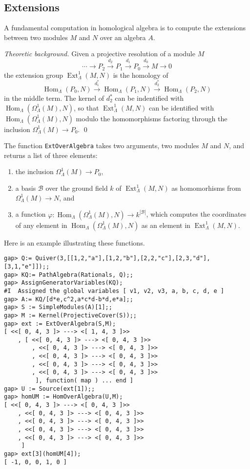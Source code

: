 \documentclass{amsart}
\newcommand{\Hom}{\operatorname{Hom}\nolimits}
\newcommand{\Ext}{\operatorname{Ext}\nolimits}
\theoremstyle{definition}
\newcommand{\code}[1]{\texttt{#1}}
\theoremstyle{theoretic}
\newenvironment{theoback}
{\medskip\small\textit{Theoretic background.} }
{\qed\par\medskip}
\begin{document}
\subsection{Extensions}
A fundamental computation in homological algebra is to compute the
extensions between two modules $M$ and $N$ over an algebra $A$.

\begin{theoback} 
Given a projective resolution of a module $M$ 
\[\cdots\to P_2\xrightarrow{d_2} P_1\xrightarrow{d_1}
P_0\xrightarrow{d_0} M\to 0\]
the extension group $\Ext^1_\Lambda(M,N)$ is the homology 
of 
\[\Hom_\Lambda(P_0,N)\xrightarrow{d_1^*} \Hom_\Lambda(P_1,N)
\xrightarrow{d_2^*} \Hom_\Lambda(P_2,N)
\]
in the middle term.  The kernel of $d_2^*$ can be indentified with
$\Hom_\Lambda(\Omega^1_\Lambda(M),N)$, so that $\Ext^1_\Lambda(M,N)$
can be identified with $\Hom_\Lambda(\Omega^1_\Lambda(M),N)$ modulo
the homomorphisms factoring through the inclusion
$\Omega^1_\Lambda(M)\to P_0$.  
\end{theoback}

The function \code{ExtOverAlgebra} takes two arguments, two modules
$M$ and $N$, and returns a list of three elements: 
\begin{enumerate}[\rm(1)]
\item the inclusion $\Omega^1_\Lambda(M)\to P_0$, 
\item a basis $\mathcal{B}$ over the ground field $k$ of
  $\Ext^1_\Lambda(M,N)$ as homomorhisms from $\Omega^1_\Lambda(M)\to
  N$, and 
\item a function $\varphi\colon \Hom_\Lambda(\Omega^1_\Lambda(M),N)
  \to k^{|\mathcal{B}|}$, which computes the coordinates of any
  element in $\Hom_\Lambda(\Omega^1_\Lambda(M),N)$  as an element in 
$\Ext^1_\Lambda(M,N)$. 
\end{enumerate}

Here is an example illustrating these functions.

\begin{verbatim}
gap> Q:= Quiver(3,[[1,2,"a"],[1,2,"b"],[2,2,"c"],[2,3,"d"],
[3,1,"e"]]);;
gap> KQ:= PathAlgebra(Rationals, Q);;
gap> AssignGeneratorVariables(KQ);
#I  Assigned the global variables [ v1, v2, v3, a, b, c, d, e ]
gap> A:= KQ/[d*e,c^2,a*c*d-b*d,e*a];;
gap> S := SimpleModules(A)[1];;
gap> M := Kernel(ProjectiveCover(S));;
gap> ext := ExtOverAlgebra(S,M);
[ <<[ 0, 4, 3 ]> ---> <[ 1, 4, 3 ]>>
    , [ <<[ 0, 4, 3 ]> ---> <[ 0, 4, 3 ]>>
        , <<[ 0, 4, 3 ]> ---> <[ 0, 4, 3 ]>>
        , <<[ 0, 4, 3 ]> ---> <[ 0, 4, 3 ]>>
        , <<[ 0, 4, 3 ]> ---> <[ 0, 4, 3 ]>>
        , <<[ 0, 4, 3 ]> ---> <[ 0, 4, 3 ]>>
         ], function( map ) ... end ]
gap> U := Source(ext[1]);;
gap> homUM := HomOverAlgebra(U,M);
[ <<[ 0, 4, 3 ]> ---> <[ 0, 4, 3 ]>>
    , <<[ 0, 4, 3 ]> ---> <[ 0, 4, 3 ]>>
    , <<[ 0, 4, 3 ]> ---> <[ 0, 4, 3 ]>>
    , <<[ 0, 4, 3 ]> ---> <[ 0, 4, 3 ]>>
    , <<[ 0, 4, 3 ]> ---> <[ 0, 4, 3 ]>>
     ]
gap> ext[3](homUM[4]);
[ -1, 0, 0, 1, 0 ]
\end{verbatim}
\end{document}
